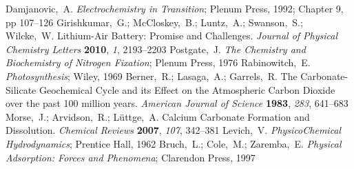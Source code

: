 \documentclass[aps,prl,twocolumn,superscriptaddress,groupedaddress]{revtex4}
\begin{document}
\begin{mcitethebibliography}{88}
Damjanovic,~A. \emph{Electrochemistry in Transition}; Plenum Press, 1992;
  Chapter 9, pp 107--126\relax
\mciteBstWouldAddEndPuncttrue
\mciteSetBstMidEndSepPunct{\mcitedefaultmidpunct}
{\mcitedefaultendpunct}{\mcitedefaultseppunct}\relax
\EndOfBibitem
{}
Girishkumar,~G.; McCloskey,~B.; Luntz,~A.; Swanson,~S.; Wilcke,~W. Lithium-Air
  Battery: Promise and Challenges. \emph{Journal of Physical Chemistry Letters}
  \textbf{2010}, \emph{1}, 2193--2203\relax
\mciteBstWouldAddEndPuncttrue
\mciteSetBstMidEndSepPunct{\mcitedefaultmidpunct}
{\mcitedefaultendpunct}{\mcitedefaultseppunct}\relax
\EndOfBibitem
{}
Postgate,~J. \emph{The Chemistry and Biochemistry of Nitrogen Fixation}; Plenum
  Press, 1976\relax
\mciteBstWouldAddEndPuncttrue
\mciteSetBstMidEndSepPunct{\mcitedefaultmidpunct}
{\mcitedefaultendpunct}{\mcitedefaultseppunct}\relax
\EndOfBibitem
{}
Rabinowitch,~E. \emph{Photosynthesis}; Wiley, 1969\relax
\mciteBstWouldAddEndPuncttrue
\mciteSetBstMidEndSepPunct{\mcitedefaultmidpunct}
{\mcitedefaultendpunct}{\mcitedefaultseppunct}\relax
\EndOfBibitem
{}
Berner,~R.; Lasaga,~A.; Garrels,~R. The Carbonate-Silicate Geochemical Cycle
  and its Effect on the Atmospheric Carbon Dioxide over the past 100 million
  years. \emph{American Journal of Science} \textbf{1983}, \emph{283},
  641--683\relax
\mciteBstWouldAddEndPuncttrue
\mciteSetBstMidEndSepPunct{\mcitedefaultmidpunct}
{\mcitedefaultendpunct}{\mcitedefaultseppunct}\relax
\EndOfBibitem
{}
Morse,~J.; Arvidson,~R.; L{\"u}ttge,~A. Calcium Carbonate Formation and
  Dissolution. \emph{Chemical Reviews} \textbf{2007}, \emph{107},
  342--381\relax
\mciteBstWouldAddEndPuncttrue
\mciteSetBstMidEndSepPunct{\mcitedefaultmidpunct}
{\mcitedefaultendpunct}{\mcitedefaultseppunct}\relax
\EndOfBibitem
{}
Levich,~V. \emph{PhysicoChemical Hydrodynamics}; Prentice Hall, 1962\relax
\mciteBstWouldAddEndPuncttrue
\mciteSetBstMidEndSepPunct{\mcitedefaultmidpunct}
{\mcitedefaultendpunct}{\mcitedefaultseppunct}\relax
\EndOfBibitem
{}
Bruch,~L.; Cole,~M.; Zaremba,~E. \emph{Physical Adsorption: Forces and
  Phenomena}; Clarendon Press, 1997\relax
\mciteBstWouldAddEndPuncttrue
\mciteSetBstMidEndSepPunct{\mcitedefaultmidpunct}

\end{mcitethebibliography}
\end{document}
